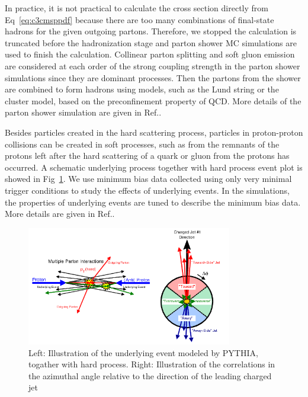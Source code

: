 In practice, it is not practical to calculate the cross section directly from Eq~\ref{eq:c3cmsppdf} because there are too many combinations of final-state hadrons for the given outgoing partons. Therefore, we stopped the calculation is truncated before the hadronization stage and parton shower MC simulations are used to finish the calculation. Collinear parton splitting and soft gluon emission are considered at each order of the strong coupling strength in the parton shower simulations since they are dominant processes. Then the
partons from the shower are combined to form hadrons using models, such as the Lund string\cite{Andersson:1983ia} or the cluster model, based on the preconfinement property of QCD\cite{Amati:1979fg}. More details of the parton shower simulation are given in Ref.\cite{Hoche:2014rga}.

Besides particles created in the hard scattering process, particles in proton-proton collisions can be created in soft processes, such as from the remnants of the protons left after the hard scattering of a quark or gluon from the protons has occurred. A schematic underlying process together with hard process event plot is showed in Fig~\ref{fig:c3cmsunderlyingevents}. We use minimum bias data collected using only very minimal trigger conditions to study the effects of underlying events. In the simulations, the properties of underlying events are tuned to describe the minimum bias data. More details are given in Ref.\cite{Field:1393621}. 

\begin{figure}[htbp]
 \begin{center}
  \includegraphics[width=0.8\textwidth]{figures/c3/c3_cms_underlyingevents.png}
 \end{center}
 \caption{Left: Illustration of the underlying event modeled by PYTHIA, togather with hard process. Right: Illustration of the correlations in the azimuthal angle relative to the direction of the leading charged jet}
 \label{fig:c3cmsunderlyingevents}
\end{figure}

